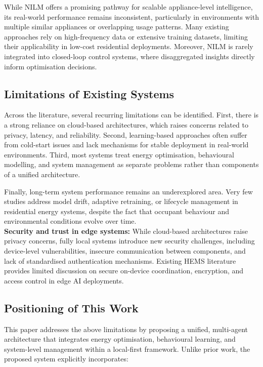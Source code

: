 \documentclass[11pt,a4paper]{article}
\begin{document}
While NILM offers a promising pathway for scalable appliance-level intelligence, its real-world performance remains inconsistent, particularly in environments with multiple similar appliances or overlapping usage patterns. Many existing approaches rely on high-frequency data or extensive training datasets, limiting their applicability in low-cost residential deployments. Moreover, NILM is rarely integrated into closed-loop control systems, where disaggregated insights directly inform optimisation decisions.

\subsection{Limitations of Existing Systems}

Across the literature, several recurring limitations can be identified. First, there is a strong reliance on cloud-based architectures, which raises concerns related to privacy, latency, and reliability. Second, learning-based approaches often suffer from cold-start issues and lack mechanisms for stable deployment in real-world environments. Third, most systems treat energy optimisation, behavioural modelling, and system management as separate problems rather than components of a unified architecture.

Finally, long-term system performance remains an underexplored area. Very few studies address model drift, adaptive retraining, or lifecycle management in residential energy systems, despite the fact that occupant behaviour and environmental conditions evolve over time.\\
\textbf{Security and trust in edge systems:} While cloud-based architectures raise privacy concerns, fully local systems introduce new security challenges, including device-level vulnerabilities, insecure communication between components, and lack of standardised authentication mechanisms. Existing HEMS literature provides limited discussion on secure on-device coordination, encryption, and access control in edge AI deployments.

\subsection{Positioning of This Work}

This paper addresses the above limitations by proposing a unified, multi-agent architecture that integrates energy optimisation, behavioural learning, and system-level management within a local-first framework. Unlike prior work, the proposed system explicitly incorporates:
\end{document}
